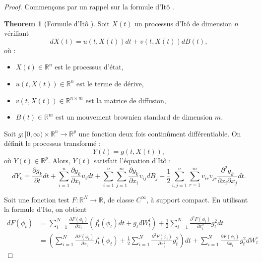 \documentclass[a4paper,10pt]{article}
\theoremstyle{definition} %
\theoremstyle{definition} %
\theoremstyle{definition} %
\newtheorem{theorem}[definition]{Theorem}
\theoremstyle{definition} %
\begin{document}
\begin{proof}
Commençons par un rappel sur la formule d'Itô . 
\begin{theorem}[Formule d'Itô \cite{Oksendal2003}]
Soit \( X(t) \) un processus d’Itô de dimension \( n \) vérifiant  
\[
dX(t) = u(t, X(t)) dt + v(t, X(t)) dB(t),
\]
où :
\begin{itemize}
    \item \( X(t) \in \mathbb{R}^n \) est le processus d’état,
    \item \( u(t, X(t)) \in \mathbb{R}^n \) est le terme de dérive,
    \item \( v(t, X(t)) \in \mathbb{R}^{n \times m} \) est la matrice de diffusion,
    \item \( B(t) \in \mathbb{R}^m \) est un mouvement brownien standard de dimension \( m \).
\end{itemize}

Soit \( g: [0, \infty) \times \mathbb{R}^n \to \mathbb{R}^p \) une fonction deux fois continûment différentiable.  
On définit le processus transformé :
\[
Y(t) = g(t, X(t)),
\]
où \( Y(t) \in \mathbb{R}^p \).  
Alors, \( Y(t) \) satisfait l’équation d’Itô :
\[
dY_k = \frac{\partial g_k}{\partial t} dt 
+ \sum\limits_{i=1}^{n} \frac{\partial g_k}{\partial x_i} u_i dt 
+ \sum\limits_{i=1}^{n} \sum\limits_{j=1}^{m} \frac{\partial g_k}{\partial x_i} v_{ij} dB_j
+ \frac{1}{2} \sum\limits_{i,j=1}^{n} \sum\limits_{r=1}^{m} v_{ir} v_{jr} \frac{\partial^2 g_k}{\partial x_i \partial x_j} dt.
\]
\end{theorem}
\vspace{3em}



Soit une fonction test $F: \mathbb{R}^N \rightarrow \mathbb{R}$, de classe $C^{\infty}$, à support compact. En utilisant la formule d'Ito, on obtient
\begin{align*}
    dF(\phi_t) &= \sum\limits_{i=1}^N \frac{\partial F(\phi_t)}{\partial x_i} (f^i_t(\phi_t)dt + g_tdW^i_t) + \frac{1}{2} \sum\limits_{i=1}^N  \frac{\partial^2 F(\phi_t)}{\partial x_i^2} g_t^2 dt \\
    &= \left(\sum\limits_{i=1}^N \frac{\partial F(\phi_t)}{\partial x_i} f^i_t(\phi_t) + \frac{1}{2} \sum\limits_{i=1}^N  \frac{\partial^2 F(\phi_t)}{\partial x_i^2} g_t^2\right)dt + \sum\limits_{i=1}^N \frac{\partial F(\phi_t)}{\partial x_i}  g_t^2dW^i_t
\end{align*}


\end{proof}
\end{document}
